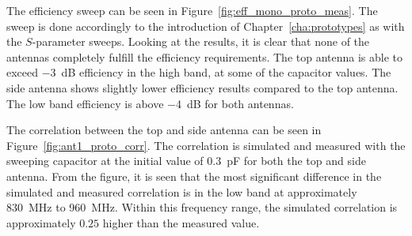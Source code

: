 The efficiency sweep can be seen in Figure~\ref{fig:eff_mono_proto_meas}. The sweep is done accordingly to the introduction of Chapter~\ref{cha:prototypes} as with the $S$-parameter sweeps. Looking at the results, it is clear that none of the antennas completely fulfill the efficiency requirements. The top antenna is able to exceed \SI{-3}{dB} efficiency in the high band, at some of the capacitor values. The side antenna shows slightly lower efficiency results compared to the top antenna. The low band efficiency is above \SI{-4}{dB} for both antennas.

The correlation between the top and side antenna can be seen in Figure~\ref{fig:ant1_proto_corr}. The correlation is simulated and measured with the sweeping capacitor at the initial value of \SI{0.3}{pF} for both the top and side antenna. From the figure, it is seen that the most significant difference in the simulated and measured correlation is in the low band at approximately \SI{830}{MHz} to \SI{960}{MHz}. Within this frequency range, the simulated correlation is approximately $0.25$ higher than the measured value.

